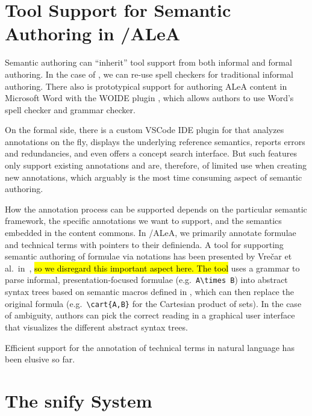 \documentclass[runningheads]{llncs}
\def\edited#1{\hl{#1}}
\newcommand\ALeA{\textsf{ALeA}\xspace}
\newcommand\snify{\textsf{snify}\xspace}
\newcommand\WOIDE{\textsf{WOIDE}\xspace}
\begin{document}
\section{Tool Support for Semantic Authoring in \sTeX/\ALeA}\label{sec:tools}

Semantic authoring can ``inherit'' tool support from both informal and formal authoring.
In the case of \sTeX, we can re-use spell checkers for traditional informal authoring.
There also is prototypical support for authoring \ALeA content in Microsoft Word with
the \WOIDE plugin \cite{KohKoh:woide24}, which allows authors to use Word's spell
checker and grammar checker.

On the formal side, there is a custom VSCode IDE plugin for \sTeX \cite{sTeX-IDE:git} that
analyzes annotations on the fly, displays the underlying reference semantics, reports
errors and redundancies, and even offers a concept search interface.  But such features
only support existing annotations and are, therefore, of limited use when creating new
annotations, which arguably is the most time consuming aspect of semantic authoring.

How the annotation process can be supported depends on the particular semantic framework,
the specific annotations we want to support, and the semantics embedded in the content
commons.  In \sTeX/\ALeA, we primarily annotate formulae and technical terms with pointers
to their definienda.  A tool for supporting semantic authoring of formulae via notations
has been presented by Vre{\v{c}}ar et al.\ in~\cite{VreWelKam:tsmmdui24},
\edited{so we disregard this important aspect here.
The tool} uses a grammar to parse informal, presentation-focused formulae (e.g.\
\lstinline[keywordstyle={}]|A\times B|) into abstract syntax trees based on semantic
macros defined in \sTeX, which can then replace the original formula (e.g.\
\lstinline|\cart{A,B}| for the Cartesian product of sets).  In the case of ambiguity,
authors can pick the correct reading in a graphical user interface that visualizes the
different abstract syntax trees.

Efficient support for the annotation of technical terms in natural language
has been elusive so far.


\section{The \snify System}\label{sec:snify}
\end{document}

